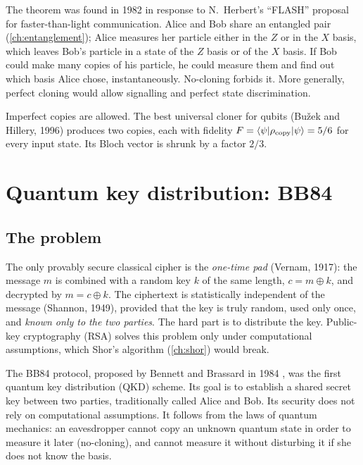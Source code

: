 \begin{remark}
The theorem was found in 1982 in response to N.~Herbert's ``FLASH'' proposal for faster-than-light communication. Alice and Bob share an entangled pair
(\cref{ch:entanglement}); Alice measures her particle either in the $Z$ or in the $X$ basis, which leaves Bob's particle in a state of the $Z$ basis or of
the $X$ basis. If Bob could make many copies of his particle, he could measure them and find out which basis Alice chose, instantaneously. No-cloning
forbids it. More generally, perfect cloning would allow signalling and perfect state discrimination.
\end{remark}
\begin{remark}
Imperfect copies are allowed. The best universal cloner for qubits (Bužek and Hillery, 1996) produces two copies, each with fidelity
$F=\left\langle\psi\middle|\rho_{\rm copy}\middle|\psi\right\rangle=5/6$ for every input state. Its Bloch vector is shrunk by a factor $2/3$.
\end{remark}

\section{Quantum key distribution: BB84}\label{sec:bb84}
\subsection{The problem}
The only provably secure classical cipher is the \emph{one-time pad} (Vernam, 1917): the message $m$ is combined with a random key $k$ of the same length,
$c=m\oplus k$, and decrypted by $m=c\oplus k$. The ciphertext is statistically independent of the message (Shannon, 1949), provided that the key is
truly random, used only once, and \emph{known only to the two parties}. The hard part is to distribute the key. Public-key cryptography (RSA) solves
this problem only under computational assumptions, which Shor's algorithm (\cref{ch:shor}) would break.

The BB84 protocol, proposed by Bennett and Brassard in 1984 \cite{BB84}, was the first quantum key distribution (QKD) scheme. Its goal is to establish a
shared secret key between two parties, traditionally called Alice and Bob. Its security does not rely on computational assumptions. It follows from the
laws of quantum mechanics: an eavesdropper cannot copy an unknown quantum state in order to measure it later (no-cloning), and cannot measure it without
disturbing it if she does not know the basis.

